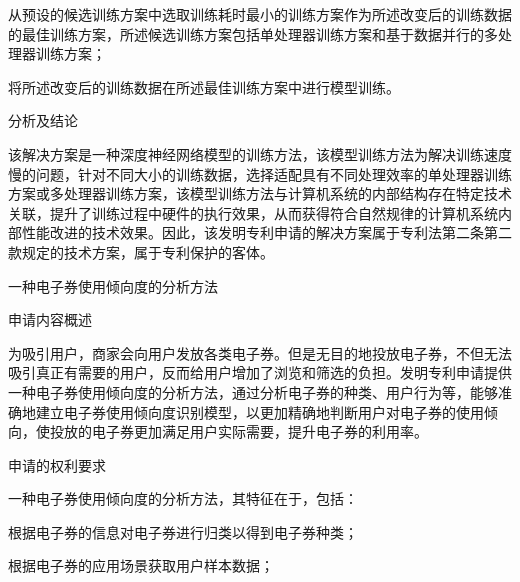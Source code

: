 {\setlength{\parindent}{20.6bp}从预设的候选训练方案中选取训练耗时最小的训练方案作为所述改变后的训练数据的最佳训练方案，所述候选训练方案包括单处理器训练方案和基于数据并行的多处理器训练方案；\par}

{\setlength{\parindent}{20.6bp}将所述改变后的训练数据在所述最佳训练方案中进行模型训练。\par}

{\setlength{\parindent}{20.1bp}分析及结论\par}

{\setlength{\parindent}{20.6bp}该解决方案是一种深度神经网络模型的训练方法，该模型训练方法为解决训练速度慢的问题，针对不同大小的训练数据，选择适配具有不同处理效率的单处理器训练方案或多处理器训练方案，该模型训练方法与计算机系统的内部结构存在特定技术关联，提升了训练过程中硬件的执行效果，从而获得符合自然规律的计算机系统内部性能改进的技术效果。因此，该发明专利申请的解决方案属于专利法第二条第二款规定的技术方案，属于专利保护的客体。\par}

{\setlength{\parindent}{15.3bp}\par}

{\setlength{\parindent}{20.6bp}一种电子券使用倾向度的分析方法\par}

{\setlength{\parindent}{20.1bp}申请内容概述\par}

{\setlength{\parindent}{20.6bp}为吸引用户，商家会向用户发放各类电子券。但是无目的地投放电子券，不但无法吸引真正有需要的用户，反而给用户增加了浏览和筛选的负担。发明专利申请提供一种电子券使用倾向度的分析方法，通过分析电子券的种类、用户行为等，能够准确地建立电子券使用倾向度识别模型，以更加精确地判断用户对电子券的使用倾向，使投放的电子券更加满足用户实际需要，提升电子券的利用率。\par}

{\setlength{\parindent}{20.1bp}申请的权利要求\par}

{\setlength{\parindent}{20.6bp}一种电子券使用倾向度的分析方法，其特征在于，包括：\par}

{\setlength{\parindent}{20.6bp}根据电子券的信息对电子券进行归类以得到电子券种类；\par}

{\setlength{\parindent}{20.6bp}根据电子券的应用场景获取用户样本数据；\par}

